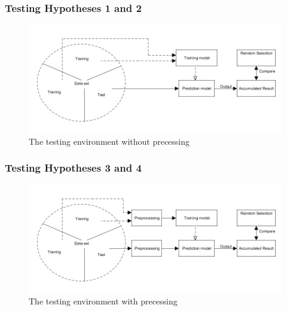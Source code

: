 \subsubsection{Testing Hypotheses 1 and 2}

\begin{figure}
\label{fig:testenvironmentraw}
\centering
\includegraphics[scale=0.3]{images/EnvironmentOnRawData}
\caption{The testing environment without precessing} 
\end{figure}

\subsubsection{Testing Hypotheses 3 and 4}

\begin{figure}
\label{fig:testenvironmentpre}
\centering
\includegraphics[scale=0.3]{images/EnvironmentWithPre}
\caption{The testing environment with precessing}
\end{figure}
